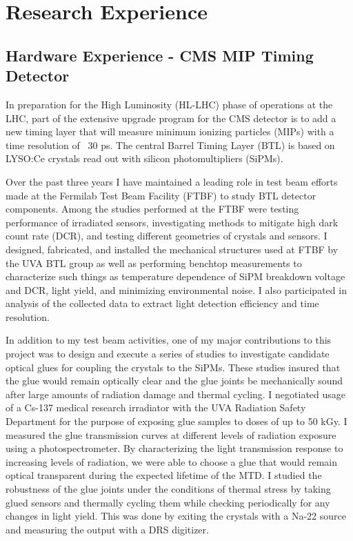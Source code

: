 \documentclass[a4paper]{article}
\begin{document}
\section{Research Experience}



\subsection{Hardware Experience - CMS MIP Timing Detector}
In preparation for the High Luminosity (HL-LHC) phase of operations at the LHC, part of the extensive upgrade program for the CMS detector is to add a new timing layer that will measure minimum ionizing particles (MIPs) with a time resolution of ~30 ps.  The central Barrel Timing Layer (BTL) is based on LYSO:Ce crystals read out with silicon photomultipliers (SiPMs).  

Over the past three years I have maintained a leading role in test beam efforts made at the Fermilab Test Beam Facility (FTBF) to study BTL detector components.  Among the studies performed at the FTBF were testing performance of irradiated sensors, investigating methods to mitigate high dark count rate (DCR), and testing different geometries of crystals and sensors.  I designed, fabricated, and installed the mechanical structures used at FTBF by the UVA BTL group as well as performing benchtop measurements to characterize such things as temperature dependence of SiPM breakdown voltage and DCR, light yield, and minimizing environmental noise.  I also participated in analysis of the collected data to extract light detection efficiency and time resolution.

In addition to my test beam activities, one of my major contributions to this project was to design and execute a series of studies to investigate candidate optical glues for coupling the crystals to the SiPMs.  These studies insured that the glue would remain optically clear and the glue joints be mechanically sound after large amounts of radiation damage and thermal cycling.  I negotiated usage of a Cs-137 medical research irradiator with the UVA Radiation Safety Department for the purpose of exposing glue samples to doses of up to 50 kGy.  I measured the glue transmission curves at different levels of radiation exposure using a photospectrometer.  By characterizing the light transmission response to increasing levels of radiation, we were able to choose a glue that would remain optical transparent during the expected lifetime of the MTD.  I studied the robustness of the glue joints under the conditions of thermal stress by taking glued sensors and thermally cycling them while checking periodically for any changes in light yield.  This was done by exiting the crystals with a Na-22 source and measuring the output with a DRS digitizer.
\end{document}
